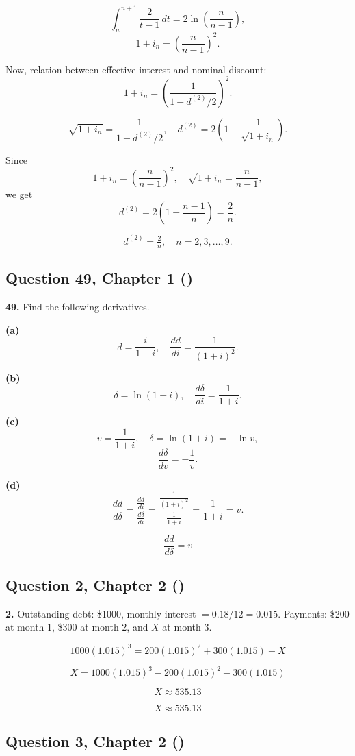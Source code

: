 \documentclass[12pt, a4paper]{article}
\begin{document}
\[
\int_n^{n+1} \frac{2}{t-1} \, dt 
= 2 \ln\!\left(\frac{n}{n-1}\right),
\]
\[
1+i_n = \left(\frac{n}{n-1}\right)^2.
\]

Now, relation between effective interest and nominal discount:
\[
1+i_n = \left(\frac{1}{1-d^{(2)}/2}\right)^2.
\]

\[
\sqrt{1+i_n} = \frac{1}{1-d^{(2)}/2},
\quad d^{(2)} = 2\left(1 - \frac{1}{\sqrt{1+i_n}}\right).
\]

Since 
\[
1+i_n = \left(\frac{n}{n-1}\right)^2,
\quad \sqrt{1+i_n} = \frac{n}{n-1},
\]
we get
\[
d^{(2)} = 2\left(1 - \frac{n-1}{n}\right) = \frac{2}{n}.
\]

\[
\boxed{d^{(2)} = \tfrac{2}{n}, \quad n=2,3,\dots,9.}
\]

\subsection*{Question 49, Chapter 1  (\cite{toi3rd})}

\textbf{49.} Find the following derivatives.

\bigskip
\textbf{(a)} 
\[
d = \frac{i}{1+i}, 
\quad \frac{dd}{di} = \frac{1}{(1+i)^2}.
\]

\bigskip
\textbf{(b)} 
\[
\delta = \ln(1+i),
\quad \frac{d\delta}{di} = \frac{1}{1+i}.
\]

\textbf{(c)} 
\[
v = \frac{1}{1+i}, \quad 
\delta = \ln(1+i) = -\ln v,
\]
\[
\frac{d\delta}{dv} = -\frac{1}{v}.
\]

\textbf{(d)} 
\[
\frac{dd}{d\delta} 
= \frac{\tfrac{dd}{di}}{\tfrac{d\delta}{di}}
= \frac{\tfrac{1}{(1+i)^2}}{\tfrac{1}{1+i}}
= \frac{1}{1+i} = v.
\]

\[
\boxed{\frac{dd}{d\delta} = v}
\]

\subsection*{Question 2, Chapter 2 (\cite{toi3rd})}

\textbf{2.} Outstanding debt: \$1000, monthly interest \(= 0.18/12 = 0.015\).  
Payments: \$200 at month 1, \$300 at month 2, and \(X\) at month 3.

\[
1000(1.015)^3 = 200(1.015)^2 + 300(1.015) + X
\]

\[
X = 1000(1.015)^3 - 200(1.015)^2 - 300(1.015)
\]

\[
X \approx 535.13
\]

\[
\boxed{X \approx 535.13}
\]


\subsection*{Question 3, Chapter 2 (\cite{toi3rd})}
\end{document}
